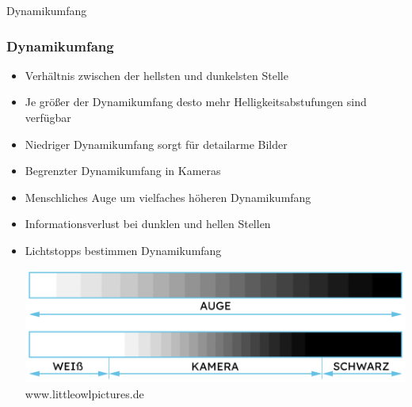 \documentclass{beamer}
\begin{document}
	\begin{frame}
		\begin{center}
			\Huge Dynamikumfang
		\end{center}
	\end{frame}

	\begin{frame}
		\frametitle{Dynamikumfang}
		\begin{itemize}[label=\textcolor{red!65!black}{\textbullet}]
			\item Verhältnis zwischen der hellsten und dunkelsten Stelle
			\item Je größer der Dynamikumfang desto mehr Helligkeitsabstufungen sind verfügbar
			\item Niedriger Dynamikumfang sorgt für detailarme Bilder
			\item Begrenzter Dynamikumfang in Kameras
			\item Menschliches Auge um vielfaches höheren Dynamikumfang
			\item Informationsverlust bei dunklen und hellen Stellen
			\item Lichtstopps bestimmen Dynamikumfang
			\begin{center}
				\includegraphics[scale=0.4]{img/Bild2.png}
				\tiny www.littleowlpictures.de
			\end{center}
		\end{itemize}
	\end{frame}
	
\end{document}
